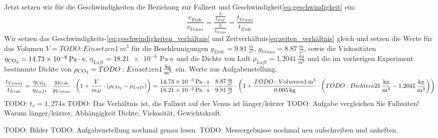 \documentclass{article}
\begin{document}
        Jetzt setzen wir für die Geschwindigkeiten die Beziehung zur Fallzeit und Geschwindigkeit\ref{eq:geschwindigkeit} ein:
        \begin{equation} \label{eq:zeiten_verhältnis}
            \frac{ v_{Erde} }{ v_{Venus} } = \frac{ \frac{h}{t_{Erde}} }{ \frac{h}{t_{Venus}} } = \frac{t_{Venus}}{t_{Erde}}
        \end{equation}
        Wir setzen das Geschwindigkeits-\ref{eq:geschwindigkeiten_verhältnis} und Zeitverhältnis\ref{eq:zeiten_verhältnis} gleich und setzen die Werte
        für das Volumen \(V = TODO:Einsetzen\SI{1}{m^3}\)
        für die Beschleunigungen \(g_{Erde} = \SI{9.81}{\frac{m}{s^2}} \), \(g_{Venus} = \SI{8.87}{\frac{m}{s^2}} \),
        sowie die Viskositäten \(\eta_{\ce{CO2}} = \SI{14.73e-6}{\pascal \cdot \second} \),  \(\eta_{Luft} = \SI{18.21e-6}{\pascal \cdot \second} \) und
        die Dichte von Luft \(\rho_{Luft} = \SI{1.2041}{\frac{kg}{m^3}}\) und die im vorherigen Experiment bestimmte Dichte von  \(\rho_{\ce{CO2}} = TODO: Einsetzen\SI{1}{\frac{kg}{m^3}} \) ein.
        Werte aus Aufgabenstellung\cite{Aufgabenstellung}.
        \begin{equation}
            \frac{t_{Venus}}{t_{Erde}} = \frac{ \eta_{\ce{CO2}}}{ \eta_{Luft} } \cdot \frac{ g_{Erde} }{ g_{Venus} } \cdot \left( 1 + \frac{V}{m_H} \cdot \left( \rho_{\ce{CO2}} - \rho_{Luft} \right) \right) = 
            \frac{ \SI{14.73e-6}{\pascal \cdot \second} }{ \SI{18.21e-6}{\pascal \cdot \second} } \cdot \frac{ \SI{8.87}{\frac{m}{s^2}} }{ \SI{9.81}{\frac{m}{s^2}} } \cdot
            \left( 1 + \frac{TODO:Volumen\SI{1}{m^3}}{ \SI{0.005}{\kilogram} } \cdot \left( TODO: Dichte co2\SI{1}{\frac{kg}{m^3}} - \SI{1.2041}{\frac{kg}{m^3}} \right) \right)
        \end{equation}
        TODO: \(t_v = 1,274s\)
        TODO: Das Verhältnis ist, die Fallzeit auf der Venus ist länger/kürzer
        TODO: Aufgabe vergleichen Sie Fallzeiten! Warum länger/kürzer, Abhängigkeit Dichte, Viskosität, Gewichtskraft.


    \printbibliography[title={Quellen}]

    TODO: Bilder
    TODO: Aufgabenstellung nochmal genau lesen.
    TODO: Messergebnisse nochmal neu aufschreiben und anheften.
\end{document}
